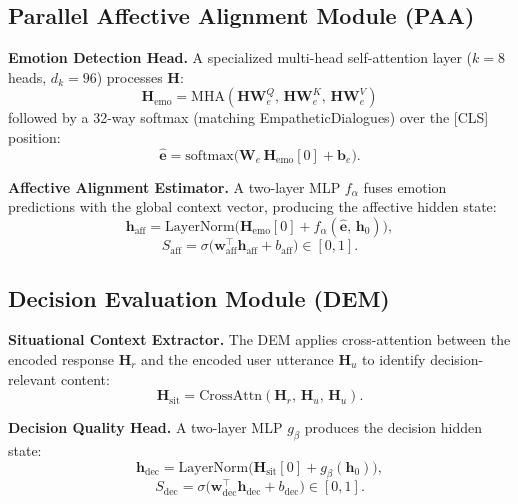 \documentclass[lettersize,journal]{IEEEtran}
\begin{document}
\subsection{Parallel Affective Alignment Module (PAA)}

\textbf{Emotion Detection Head.}
A specialized multi-head self-attention layer ($k{=}8$ heads, $d_k{=}96$)
processes $\mathbf{H}$:
\begin{equation}
\mathbf{H}_\mathrm{emo}
  = \mathrm{MHA}(\mathbf{H}\mathbf{W}_e^Q,\,
                 \mathbf{H}\mathbf{W}_e^K,\,
                 \mathbf{H}\mathbf{W}_e^V)
\end{equation}
followed by a 32-way softmax (matching EmpatheticDialogues) over the [CLS]
position:
\begin{equation}
\hat{\mathbf{e}}
  = \mathrm{softmax}\!\bigl(\mathbf{W}_e\,\mathbf{H}_\mathrm{emo}[0]+\mathbf{b}_e\bigr).
\end{equation}

\textbf{Affective Alignment Estimator.}
A two-layer MLP $f_\alpha$ fuses emotion predictions with the global context
vector, producing the affective hidden state:
\begin{equation}
\mathbf{h}_\mathrm{aff}
  = \mathrm{LayerNorm}\!\bigl(
      \mathbf{H}_\mathrm{emo}[0]
      + f_\alpha(\hat{\mathbf{e}},\,\mathbf{h}_0)\bigr),
\label{eq:haff}
\end{equation}
\begin{equation}
S_\mathrm{aff}
  = \sigma\!\bigl(\mathbf{w}_\mathrm{aff}^\top\mathbf{h}_\mathrm{aff}
                  + b_\mathrm{aff}\bigr) \in [0,1].
\end{equation}

\subsection{Decision Evaluation Module (DEM)}

\textbf{Situational Context Extractor.}
The DEM applies cross-attention between the encoded response
$\mathbf{H}_r$ and the encoded user utterance $\mathbf{H}_u$ to identify
decision-relevant content:
\begin{equation}
\mathbf{H}_\mathrm{sit}
  = \mathrm{CrossAttn}(\mathbf{H}_r,\,\mathbf{H}_u,\,\mathbf{H}_u).
\end{equation}

\textbf{Decision Quality Head.}
A two-layer MLP $g_\beta$ produces the decision hidden state:
\begin{equation}
\mathbf{h}_\mathrm{dec}
  = \mathrm{LayerNorm}\!\bigl(
      \mathbf{H}_\mathrm{sit}[0]
      + g_\beta(\mathbf{h}_0)\bigr),
\label{eq:hdec}
\end{equation}
\begin{equation}
S_\mathrm{dec}
  = \sigma\!\bigl(\mathbf{w}_\mathrm{dec}^\top\mathbf{h}_\mathrm{dec}
                  + b_\mathrm{dec}\bigr) \in [0,1].
\end{equation}
\end{document}
